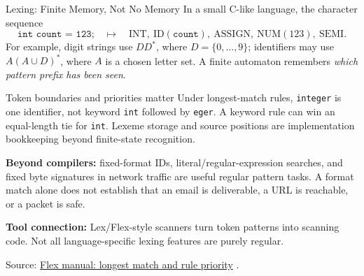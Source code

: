 \documentclass[10pt]{beamer}
\newcommand{\paperlink}[2]{%
  \href{#1}{\textcolor{blue!65!black}{#2}}%
}
\begin{document}
\begin{frame}{Lexing: Finite Memory, Not No Memory}
  \small
  In a small C-like language, the character sequence
  \[
    \texttt{int count = 123;}
    \quad\longmapsto\quad
    \mathrm{INT},\ \mathrm{ID}(\texttt{count}),\ \mathrm{ASSIGN},\
      \mathrm{NUM}(123),\ \mathrm{SEMI}.
  \]
  For example, digit strings use $DD^*$, where $D=\{0,\ldots,9\}$;
  identifiers may use $A(A\cup D)^*$, where $A$ is a chosen letter set.
  A finite automaton remembers \emph{which pattern prefix has been seen}.
  \pause
  \begin{block}{Token boundaries and priorities matter}
    Under longest-match rules, \texttt{integer} is one identifier, not
    keyword \texttt{int} followed by \texttt{eger}. A keyword rule can win
    an equal-length tie for \texttt{int}. Lexeme storage and source positions
    are implementation bookkeeping beyond finite-state recognition.
  \end{block}
  \pause
  \textbf{Beyond compilers:} fixed-format IDs, literal/regular-expression
  searches, and fixed byte signatures in network traffic are useful regular
  pattern tasks. A format match alone does not establish that an email is
  deliverable, a URL is reachable, or a packet is safe.
  \par\smallskip
  \textbf{Tool connection:} Lex/Flex-style scanners turn token patterns into
  scanning code. Not all language-specific lexing features are purely regular.
  \par\smallskip
  {\scriptsize Source: \paperlink{https://westes.github.io/flex/manual/Matching.html}
  {Flex manual: longest match and rule priority}.}
\end{frame}
\end{document}
